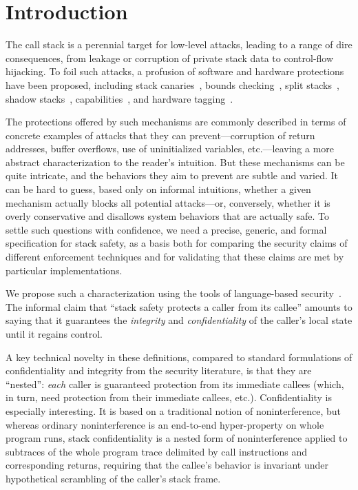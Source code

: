 \documentclass[10pt,conference]{ieeetran}%
\theoremstyle{definition}
\begin{document}
\newcommand{\paragraphx}[1]{\emph{#1.}}

\section{Introduction}

The call stack is a perennial target for low-level attacks, leading to a
range of dire consequences, from leakage or corruption of private stack data
to control-flow hijacking. To foil such attacks, a profusion of
software and hardware protections have been proposed,
%
including stack canaries~\cite{Cowan+98},
bounds checking~\cite{NagarakatteZMZ09,NagarakatteZMZ10,DeviettiBMZ08},
split stacks~\cite{Kuznetsov+14},
shadow stacks~\cite{Dang+15,Shanbhogue+19},
capabilities~\cite{Woodruff+14,Chisnall+15,SkorstengaardLocal,SkorstengaardSTKJFP,Georges+21},
and hardware tagging~\cite{DBLP:conf/sp/RoesslerD18}. \ifaftersubmission{}
\fi

The protections offered by such mechanisms are commonly described in terms
of concrete examples of attacks that they can prevent---corruption of return
addresses, buffer overflows, use of uninitialized variables, etc.---leaving
a more abstract characterization to the reader's intuition.  But these
mechanisms can be quite intricate, and the behaviors they aim to prevent are
subtle and varied.  It can be hard to guess, based only on informal
intuitions, whether a given mechanism actually blocks all potential
attacks---or, conversely, whether it is overly conservative and disallows
system behaviors that are actually safe.
To settle such questions with confidence,
we need a precise, generic, and formal specification for stack
safety, as a basis both for comparing the security claims of different
enforcement techniques and for validating that these claims
are met by particular implementations.

We propose such a characterization using the tools of language-based
security~\cite{sabelfeld2003language}. The informal claim that
``stack safety protects a caller
from its callee'' amounts to saying that it guarantees the {\em integrity} and
{\em confidentiality} of the caller’s local state until it regains control.

A key technical novelty in these definitions,
compared to standard formulations of confidentiality and integrity from the
security literature, is that they
are ``nested'': {\em each} caller is guaranteed protection from its
immediate callees (which, in turn, need protection from their immediate
callees, etc.).
Confidentiality is especially interesting. It is based on a traditional
notion of noninterference, but whereas ordinary noninterference
is an end-to-end hyper-property on whole program runs, stack
confidentiality is a nested form of noninterference applied to
subtraces of the whole program trace delimited by call instructions
and corresponding returns, requiring that the callee’s behavior is
invariant under hypothetical scrambling of the caller’s stack frame.
\end{document}
